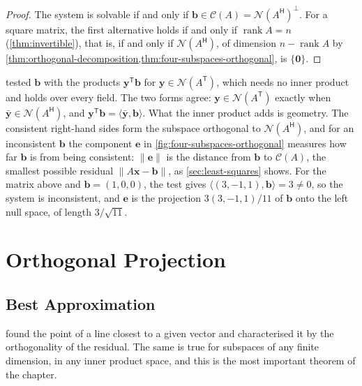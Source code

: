 \begin{proof}
The system is solvable if and only if $\mathbf b\in\mathcal C(A)=\mathcal N(A^{\mathsf H})^\perp$. For a square matrix, the first alternative holds if and only if $\operatorname{rank}A=n$ (\cref{thm:invertible}), that is, if and only if $\mathcal N(A^{\mathsf H})$, of dimension $n-\operatorname{rank}A$ by \cref{thm:orthogonal-decomposition,thm:four-subspaces-orthogonal}, is $\{\mathbf 0\}$.
\end{proof}

 tested $\mathbf b$ with the products $\mathbf y^{\mathsf T}\mathbf b$ for $\mathbf y\in\mathcal N(A^{\mathsf T})$, which needs no inner product and holds over every field. The two forms agree: $\mathbf y\in\mathcal N(A^{\mathsf T})$ exactly when $\bar{\mathbf y}\in\mathcal N(A^{\mathsf H})$, and $\mathbf y^{\mathsf T}\mathbf b=\langle\bar{\mathbf y},\mathbf b\rangle$. What the inner product adds is geometry. The consistent right-hand sides form the subspace orthogonal to $\mathcal N(A^{\mathsf H})$, and for an inconsistent $\mathbf b$ the component $\mathbf e$ in \cref{fig:four-subspaces-orthogonal} measures how far $\mathbf b$ is from being consistent: $\|\mathbf e\|$ is the distance from $\mathbf b$ to $\mathcal C(A)$, the smallest possible residual $\|A\mathbf x-\mathbf b\|$, as \cref{sec:least-squares} shows. For the matrix above and $\mathbf b=(1,0,0)$, the test gives $\langle(3,-1,1),\mathbf b\rangle=3\ne0$, so the system is inconsistent, and $\mathbf e$ is the projection $3(3,-1,1)/11$ of $\mathbf b$ onto the left null space, of length $3/\sqrt{11}$.

\section{Orthogonal Projection}
\label{sec:orthogonal-projection}

\subsection{Best Approximation}

 found the point of a line closest to a given vector and characterised it by the orthogonality of the residual. The same is true for subspaces of any finite dimension, in any inner product space, and this is the most important theorem of the chapter.

